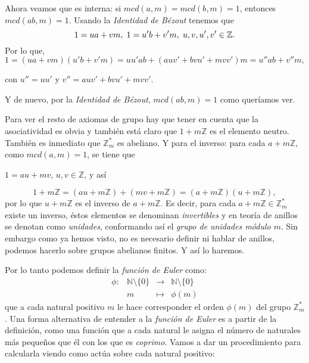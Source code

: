 \documentclass[12pt]{article}
\begin{document}
Ahora veamos que es interna: si $mcd(a,m) = mcd(b,m) = 1$, entonces $mcd(ab,m) = 1$. Usando la \textit{Identidad de Bézout} tenemos que $$1 = ua +vm, \hspace{0.1cm} 1= u'b + v'm, \hspace{0.1cm} u,v,u',v' \in \mathbb{Z}.$$ Por lo que, $$1 = (ua +vm)(u'b + v'm)= uu'ab+(auv'+bvu' + mvv')m = u'' ab + v''m,$$
\begin{center}
con $u''= uu'$ y $v''= auv'+bvu' + mvv'$.
\end{center}
Y de nuevo, por la \textit{Identidad de Bézout}, $mcd(ab,m)=1$ como queríamos ver.

Para ver el resto de axiomas de grupo hay que tener en cuenta que la asociatividad es obvia y también está claro que $1 + m\mathbb{Z}$ es el elemento neutro. También es inmediato que $\mathbb{Z}_{m}^{\ast}$ es abeliano. Y para el inverso: para cada $a + m\mathbb{Z}$, como $mcd(a,m)=1$, se tiene que 
\begin{center}
$1= au+mv$, $u,v \in \mathbb{Z}$, y así
\end{center}
$$1 + m\mathbb{Z} = (au+ m\mathbb{Z}) + (mv + m\mathbb{Z}) = (a + m\mathbb{Z})(u+ m\mathbb{Z}),$$ por lo que $u + m\mathbb{Z}$ es el inverso de $a + m\mathbb{Z}$. Es decir, para cada $a + m\mathbb{Z} \in \mathbb{Z}_{m}^{\ast}$ existe un inverso, éstos elementos se denominan \textit{invertibles} y en teoría de anillos se denotan como \textit{unidades}, conformando así el \textit{grupo de unidades módulo $m$}. Sin embargo como ya hemos visto, no es necesario definir ni hablar de anillos, podemos hacerlo sobre grupos abelianos finitos. Y así lo haremos.

Por lo tanto podemos definir la \textit{función de Euler} como:
$$\begin{array}{rccl}
\phi\colon &\mathbb{N}\setminus \lbrace 0 \rbrace & \longrightarrow &\mathbb{N}\setminus \lbrace 0 \rbrace\\
&m& \longmapsto &\phi (m)
\end{array}
$$ que a cada natural positivo $m$ le hace corresponder el orden $\phi(m)$ del grupo $\mathbb{Z}_{m}^{\ast}$. Una forma alternativa de entender a la \textit{función de Euler} es a partir de la definición, como una función que a cada natural le asigna el número de naturales más pequeños que él con los que es \textit{coprimo}. Vamos a dar un procedimiento para calcularla viendo como actúa sobre cada natural positivo:
\end{document}
